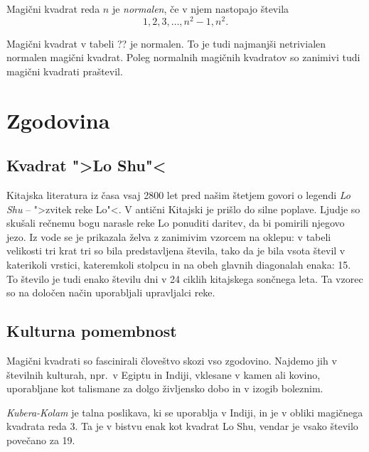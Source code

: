 \documentclass[a4paper,12pt]{article}
\begin{document}
   Magični kvadrat reda \(n\) je \emph{normalen}, če v njem nastopajo števila
   \begin{equation}
      1, 2, 3, \ldots, n^2-1, n^2.
   \end{equation}

Magični kvadrat v tabeli ?? je normalen.
To je tudi najmanjši netrivialen normalen magični kvadrat.
Poleg normalnih magičnih kvadratov so zanimivi tudi magični kvadrati praštevil. %


\section{Zgodovina}

\subsection{Kvadrat ">Lo Shu"<}

Kitajska literatura iz časa vsaj 2800 let pred našim štetjem govori o legendi
\emph{Lo Shu} -- ">zvitek reke Lo"<. V antični Kitajski je prišlo do
silne poplave. Ljudje so skušali rečnemu bogu narasle reke Lo ponuditi daritev,
da bi pomirili njegovo jezo. Iz vode se je prikazala želva z zanimivim vzorcem
na oklepu: v tabeli velikosti tri krat tri so bila predstavljena števila, tako
da je bila vsota števil v katerikoli vrstici, kateremkoli stolpcu in na obeh
glavnih diagonalah enaka: 15. To število je tudi enako številu dni v 24 ciklih
kitajskega sončnega leta. Ta vzorec so na določen način uporabljali upravljalci
reke.


\subsection{Kulturna pomembnost}

Magični kvadrati so fascinirali človeštvo skozi vso zgodovino. Najdemo jih
v številnih kulturah, npr.\ v Egiptu in Indiji, vklesane v kamen ali
kovino, uporabljane kot talismane za dolgo življensko dobo in v
izogib boleznim.

\emph{Kubera-Kolam} je talna poslikava, ki se uporablja v Indiji, in je v
obliki magičnega kvadrata reda 3. Ta je v bistvu enak kot kvadrat
Lo Shu, vendar je vsako število povečano za 19.
\end{document}
